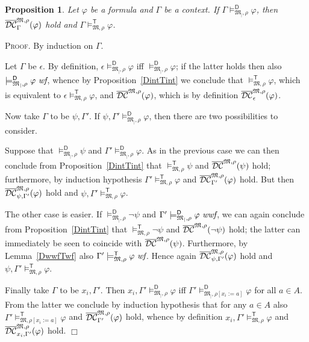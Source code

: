 \documentclass{article}
\newtheorem{proposition}[definition]{Proposition}
\newenvironment{proof}{\smallskip\textsc{Proof.}}{\hspace*{\fill}$\Box$}
\newcommand{\restrfun}[1]{\ensuremath{{#1}_|}}
\newcommand{\wf}{\ \mbox{\em wf}}
\newcommand{\wwf}{\ \mbox{\em wwf}}
\newcommand{\mymodelss}[3]{\ensuremath{\models_{\mathfrak{#2},{#3}}^{\mathsf{#1}}}}
\newcommand{\semDC}[2][{\mathfrak M},\rho]{\ensuremath{\overline{\cal{DC}}^{#1}_{#2}}}
\begin{document}
\begin{proposition}\label{DconsTcons}
Let $\varphi$ be a formula and $\Gamma$ be a context.  If
$\Gamma\mymodelss{D}{\restrfun M}\rho\varphi$, then
$\semDC{\Gamma}(\varphi)$ hold and $\Gamma\mymodelss{T}{M}\rho\varphi$.
\end{proposition}
\begin{proof}
By induction on $\Gamma$.

Let $\Gamma$ be $\epsilon$.  By definition,
$\epsilon\mymodelss{D}{\restrfun M}\rho\varphi$ iff
$\mymodelss{D}{\restrfun M}\rho\varphi$; if the latter holds then also
$\mymodelss{D}{\restrfun M}\rho\varphi\wf$, whence by
Proposition~\ref{DintTint} we conclude that
$\mymodelss{T}M\rho\varphi$, which is equivalent to
$\epsilon\mymodelss{T}M\rho\varphi$, and $\semDC{}(\varphi)$, which is
by definition $\semDC{\epsilon}(\varphi)$.

Now take $\Gamma$ to be $\psi,\Gamma'$.  If
$\psi,\Gamma'\mymodelss{D}{\restrfun M}\rho\varphi$, then there are
two possibilities to consider.

Suppose that $\mymodelss{D}{\restrfun M}\rho\psi$ and
$\Gamma'\mymodelss{D}{\restrfun M}\rho\varphi$.  As in the previous case
we can then conclude from Proposition~\ref{DintTint} that
$\mymodelss{T}M\rho\psi$ and $\semDC{}(\psi)$ hold; furthermore, by
induction hypothesis $\Gamma'\mymodelss{T}M\rho\varphi$ and
$\semDC{\Gamma'}(\varphi)$ hold.  But then $\semDC{\psi,\Gamma'}(\varphi)$
hold and $\psi,\Gamma'\mymodelss{T}M\rho\varphi$.

The other case is easier.  If $\mymodelss{D}{\restrfun M}\rho\neg\psi$
and $\Gamma'\mymodelss{D}{\restrfun M}\rho\varphi\wwf$, we can again
conclude from Proposition~\ref{DintTint} that $\mymodelss{T}M\rho\neg\psi$
and $\semDC{}(\neg\psi)$ hold; the latter can immediately be seen to
coincide with $\semDC{}(\psi)$.  Furthermore, by Lemma~\ref{DwwfTwf}
also $\Gamma'\mymodelss{T}M\rho\varphi\wf$.  Hence again
$\semDC{\psi,\Gamma'}(\varphi)$ hold and
$\psi,\Gamma'\mymodelss{T}M\rho\varphi$.

Finally take $\Gamma$ to be $x_i,\Gamma'$.  Then
$x_i,\Gamma'\mymodelss{D}{\restrfun M}\rho\varphi$ iff
$\Gamma'\mymodelss{D}{\restrfun M}{\rho[x_i:=a]}\varphi$ for all $a\in
A$.  From the latter we conclude by induction hypothesis that for any
$a\in A$ also $\Gamma'\mymodelss{T}M{\rho[x_i:=a]}\varphi$ and
$\semDC{\Gamma'}(\varphi)$ hold, whence by definition
$x_i,\Gamma'\mymodelss{T}M\rho\varphi$ and
$\semDC{x_i,\Gamma'}(\varphi)$ hold.
\end{proof}
\end{document}
